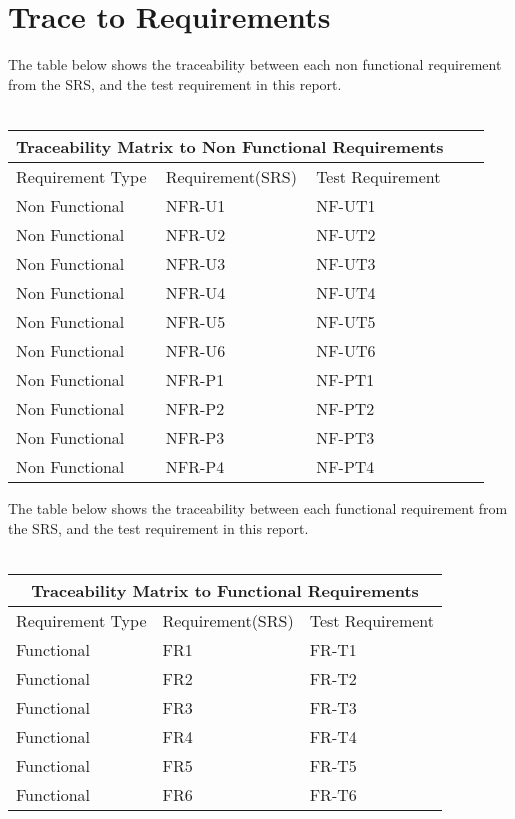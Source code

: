 \documentclass[12pt, titlepage]{article}
\begin{document}
\section{Trace to Requirements}
The table below shows the traceability between each non functional requirement from the SRS, and the test requirement in this report.\\
\\
\begin{tabular}{ |p{3cm}||p{4cm}|p{4cm}|p{4cm}|p{4cm}| }
  \hline
  \multicolumn{3}{|c|}{Traceability Matrix to Non Functional Requirements} \\
  \hline
  Requirement Type & Requirement(SRS) & Test Requirement \\
  \hline
  Non Functional   & NFR-U1  & NF-UT1  \\ \hline
  Non Functional   & NFR-U2  & NF-UT2  \\ \hline
  Non Functional   & NFR-U3  & NF-UT3  \\ \hline
  Non Functional   & NFR-U4  & NF-UT4  \\ \hline
  Non Functional   & NFR-U5  & NF-UT5   \\ \hline
  Non Functional   & NFR-U6  & NF-UT6  \\ \hline
  Non Functional   & NFR-P1  & NF-PT1  \\ \hline
  Non Functional   & NFR-P2  & NF-PT2  \\ \hline
  Non Functional   & NFR-P3  & NF-PT3  \\ \hline
  Non Functional   & NFR-P4  & NF-PT4  \\ \hline
  
 \end{tabular}

 The table below shows the traceability between each functional requirement from the SRS, and the test requirement in this report.\\
\\
 \begin{tabular}{ |p{3cm}||p{4cm}|p{4cm}| }
  \hline
  \multicolumn{3}{|c|}{Traceability Matrix to Functional Requirements} \\
  \hline
  Requirement Type & Requirement(SRS) & Test Requirement \\
  \hline
  Functional   & FR1  & FR-T1 \\ \hline
  Functional   & FR2  & FR-T2  \\ \hline
  Functional   & FR3  & FR-T3 \\ \hline
  Functional   & FR4  & FR-T4  \\ \hline
  Functional   & FR5  & FR-T5  \\ \hline
  Functional   & FR6  & FR-T6 \\ \hline
  
 \end{tabular}
\end{document}
